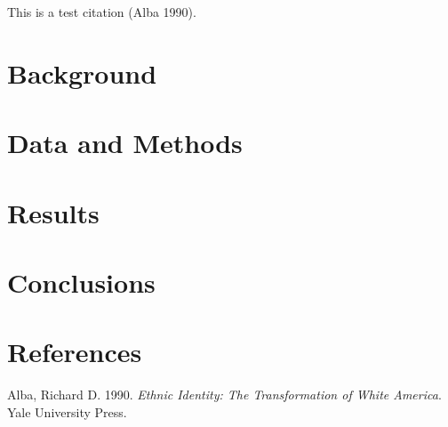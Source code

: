 \documentclass[
  12pt,
  letterpaper,
]{article}
\newlength{\cslhangindent}
\newenvironment{CSLReferences}[2] %
 {\begin{list}{}{%
  \setlength{\itemindent}{0pt}
  \setlength{\leftmargin}{0pt}
  \setlength{\parsep}{0pt}
  \ifodd #1
   \setlength{\leftmargin}{\cslhangindent}
   \setlength{\itemindent}{-1\cslhangindent}
  \fi
  \setlength{\itemsep}{#2\baselineskip}}}
 {\end{list}}
\begin{document}
This is a test citation (Alba 1990).

\section{Background}\label{background}

\section{Data and Methods}\label{data-and-methods}

\section{Results}\label{results}

\section{Conclusions}\label{conclusions}

\section*{References}\label{bibliography}

\label{refs}
\begin{CSLReferences}{1}{0}
Alba, Richard D. 1990. \emph{Ethnic Identity: The Transformation of
White America}. Yale University Press.

\end{CSLReferences}
\end{document}
